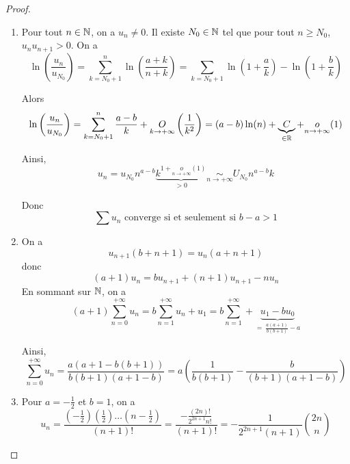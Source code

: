 \documentclass[12pt]{article}
\begin{document}
\begin{proof}
	\phantom{}
	\begin{enumerate}
		\item Pour tout $n\in\mathbb{N}$, on a $u_{n}\neq 0$. Il existe $N_{0}\in\mathbb{N}$ tel que pour tout $n\geqslant N_{0}$, $u_{n}u_{n+1}>0$. On a 
		\begin{equation*}\ln\left(\frac{u_{n}}{u_{N_{0}}}\right)=\sum_{k=N_{0}+1}^{n}\ln\left(\frac{a+k}{n+k}\right)=\sum_{k=N_{0}+1}\ln\left(1+\frac{a}{k}\right)-\ln\left(1+\frac{b}{k}\right)\end{equation*}

		Alors 
		\begin{equation*}\ln\left(\frac{u_{n}}{u_{N_{0}}}\right)=\sum_{k=N_{0}+1}^{n}\frac{a-b}{k}+\underset{k\to+\infty}{O}\left(\frac{1}{k^{2}}\right)=(a-b)\ln(n)+\underbrace{C}_{\in\mathbb{R}}+\underset{n\to+\infty}{o}(1)\end{equation*}

		Ainsi,
		\begin{equation*}u_{n}=u_{N_{0}}n^{a-b}\underbrace{k^{1+\underset{n\to+\infty}{o}(1)}}_{>0}\underset{n\to+\infty}{\sim}U_{N_{0}}n^{a-b}k\end{equation*}

		Donc 
		\begin{equation*}\boxed{\sum u_{n}\text{ converge si et seulement si }b-a>1}\end{equation*}

		\item On a 
		\begin{equation*}u_{n+1}(b+n+1)=u_{n}(a+n+1)\end{equation*}
		donc 
		\begin{equation*}(a+1)u_{n}=bu_{n+1}+(n+1)u_{n+1}-nu_{n}\end{equation*}
		En sommant sur $\mathbb{N}$, on a 
		\begin{equation*}(a+1)\sum_{n=0}^{+\infty}u_{n}=b\sum_{n=1}^{+\infty}u_{n}+u_{1}=b\sum_{n=1}^{+\infty}+\underbrace{u_{1}-bu_{0}}_{=~\frac{a(a+1)}{b(b+1)}-a}\end{equation*}

		Ainsi, 
		\begin{equation*}\boxed{\sum_{n=0}^{+\infty}u_{n}=\frac{a\left(a+1-b\left(b+1\right)\right)}{b\left(b+1\right)\left(a+1-b\right)}=a\left(\frac{1}{b(b+1)}-\frac{b}{(b+1)(a+1-b)}\right)}\end{equation*}

		\item Pour $a=-\frac{1}{2}$ et $b=1$, on a 
		\begin{equation*}\boxed{u_{n}=\frac{\left(-\frac{1}{2}\right)\left(\frac{1}{2}\right)\dots\left(n-\frac{1}{2}\right)}{(n+1)!}=\frac{-\frac{(2n)!}{2^{2n+1}n!}}{(n+1)!}=-\frac{1}{2^{2n+1}(n+1)}\binom{2n}{n}}\end{equation*}
	\end{enumerate}
\end{proof}
\end{document}
